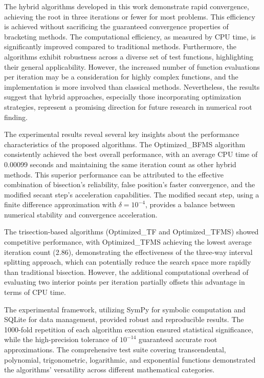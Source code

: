 \documentclass[amsmath, amssymb, aps]{revtex4-2}
\begin{document}
The hybrid algorithms developed in this work demonstrate rapid convergence, achieving the root in three iterations or fewer for most problems. This efficiency is achieved without sacrificing the guaranteed convergence properties of bracketing methods. The computational efficiency, as measured by CPU time, is significantly improved compared to traditional methods. Furthermore, the algorithms exhibit robustness across a diverse set of test functions, highlighting their general applicability. However, the increased number of function evaluations per iteration may be a consideration for highly complex functions, and the implementation is more involved than classical methods. Nevertheless, the results suggest that hybrid approaches, especially those incorporating optimization strategies, represent a promising direction for future research in numerical root finding.

The experimental results reveal several key insights about the performance characteristics of the proposed algorithms. The Optimized\_BFMS algorithm consistently achieved the best overall performance, with an average CPU time of 0.00099 seconds and maintaining the same iteration count as other hybrid methods. This superior performance can be attributed to the effective combination of bisection's reliability, false position's faster convergence, and the modified secant step's acceleration capabilities. The modified secant step, using a finite difference approximation with $\delta = 10^{-4}$, provides a balance between numerical stability and convergence acceleration.

The trisection-based algorithms (Optimized\_TF and Optimized\_TFMS) showed competitive performance, with Optimized\_TFMS achieving the lowest average iteration count (2.86), demonstrating the effectiveness of the three-way interval splitting approach, which can potentially reduce the search space more rapidly than traditional bisection. However, the additional computational overhead of evaluating two interior points per iteration partially offsets this advantage in terms of CPU time.

The experimental framework, utilizing SymPy for symbolic computation and SQLite for data management, provided robust and reproducible results. The 1000-fold repetition of each algorithm execution ensured statistical significance, while the high-precision tolerance of $10^{-14}$ guaranteed accurate root approximations. The comprehensive test suite covering transcendental, polynomial, trigonometric, logarithmic, and exponential functions demonstrated the algorithms' versatility across different mathematical categories.
\end{document}
